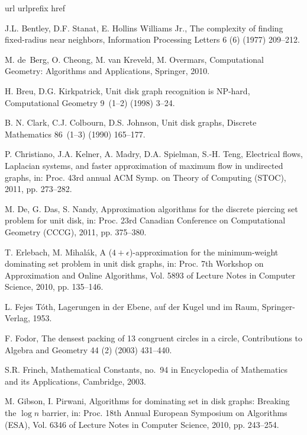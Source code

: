 \documentclass[preprint,12pt]{elsarticle}
\begin{document}
\begin{thebibliography}{10}
\expandafter\ifx\csname url\endcsname\relax
  \def\url#1{\texttt{#1}}\fi
\expandafter\ifx\csname urlprefix\endcsname\relax\def\urlprefix{URL }\fi
\expandafter\ifx\csname href\endcsname\relax
  \def\href#1#2{#2} \def\path#1{#1}\fi

J.L. Bentley, D.F. Stanat, E. Hollins Williams Jr.,
The complexity of finding fixed-radius near neighbors,
Information Processing Letters 6 (6) (1977) 209--212.

M. de~Berg, O. Cheong, M. van Kreveld, M. Overmars, Computational Geometry:
  Algorithms and Applications, Springer, 2010.

H. Breu, D.G. Kirkpatrick, Unit disk graph recognition is NP-hard,
Computational Geometry 9~(1--2) (1998) 3--24.

B. N. Clark, C.J. Colbourn, D.S. Johnson, Unit disk graphs, Discrete
  Mathematics 86~(1--3) (1990) 165--177.

P. Christiano, J.A. Kelner, A. Madry, D.A. Spielman, S.-H. Teng, Electrical
  flows, {L}aplacian systems, and faster approximation of maximum flow in
  undirected graphs, in: Proc. 43rd annual ACM Symp. on Theory of Computing
  (STOC), 2011, pp. 273--282.


M. De, G. Das, S. Nandy, Approximation algorithms for the discrete piercing set
  problem for unit disk, in: Proc. 23rd Canadian Conference on Computational
  Geometry (CCCG), 2011, pp. 375--380.


T. Erlebach, M. Mihal\'{a}k, A ($4 + \epsilon$)-approximation for the
  minimum-weight dominating set problem in unit disk graphs, in: Proc. 7th
  Workshop on Approximation and Online Algorithms, Vol. 5893 of Lecture Notes
  in Computer Science, 2010, pp. 135--146.


L. Fejes T\'oth, Lagerungen in der Ebene, auf der Kugel und im Raum,
  Springer-Verlag, 1953.

F. Fodor, The densest packing of 13 congruent circles in a circle,
  Contributions to Algebra and Geometry 44 (2) (2003) 431--440.


S.R. Frinch, Mathematical Constants, no.~94 in Encyclopedia of Mathematics and
  its Applications, Cambridge, 2003.

M. Gibson, I. Pirwani, Algorithms for dominating set in disk graphs: Breaking
  the $\log n$ barrier, in: Proc. 18th Annual European Symposium on Algorithms
  (ESA), Vol. 6346 of Lecture Notes in Computer Science, 2010, pp. 243--254.


\end{thebibliography}
\end{document}
